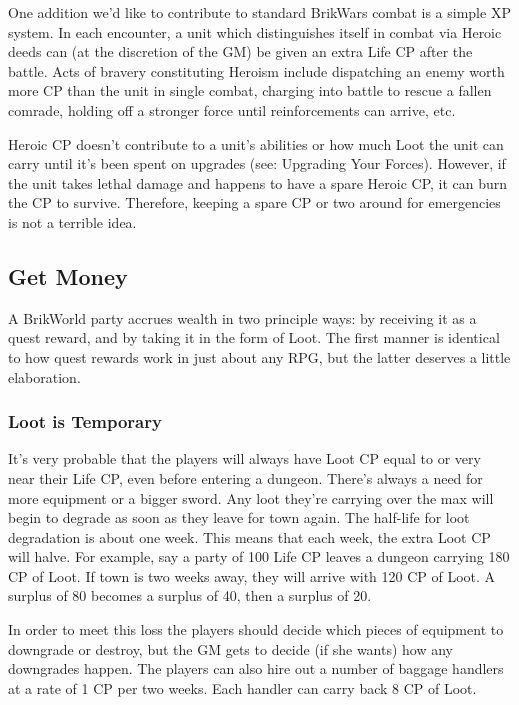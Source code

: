 \documentclass[12pt,a4paper,twocolumn]{article}
\begin{document}
One addition we'd like to contribute to standard BrikWars combat is a simple XP system.  In each encounter, a unit which distinguishes itself in combat via Heroic deeds can (at the discretion of the GM) be given an extra Life CP after the battle.  Acts of bravery constituting Heroism include dispatching an enemy worth more CP than the unit in single combat, charging into battle to rescue a fallen comrade, holding off a stronger force until reinforcements can arrive, etc.  

Heroic CP doesn't contribute to a unit's abilities or how much Loot the unit can carry until it's been spent on upgrades (see: Upgrading Your Forces).  However, if the unit takes lethal damage and happens to have a spare Heroic CP, it can burn the CP to survive.  Therefore, keeping a spare CP or two around for emergencies is not a terrible idea.

\subsection{Get Money}

A BrikWorld party accrues wealth in two principle ways: by receiving it as a quest reward, and by taking it in the form of Loot.  The first manner is identical to how quest rewards work in just about any RPG, but the latter deserves a little elaboration.

\subsubsection{Loot is Temporary}

It's very probable that the players will always have Loot CP equal to or very near their Life CP, even before entering a dungeon.  There's always a need for more equipment or a bigger sword.  Any loot they're carrying over the max will begin to degrade as soon as they leave for town again.  The half-life for loot degradation is about one week.  This means that each week, the extra Loot CP will halve.  For example, say a party of 100 Life CP leaves a dungeon carrying 180 CP of Loot.  If town is two weeks away, they will arrive with 120 CP of Loot.  A surplus of 80 becomes a surplus of 40, then a surplus of 20.  

In order to meet this loss the players should decide which pieces of equipment to downgrade or destroy, but the GM gets to decide (if she wants) how any downgrades happen.  The players can also hire out a number of baggage handlers at a rate of 1 CP per two weeks.  Each handler can carry back 8 CP of Loot.
\end{document}
